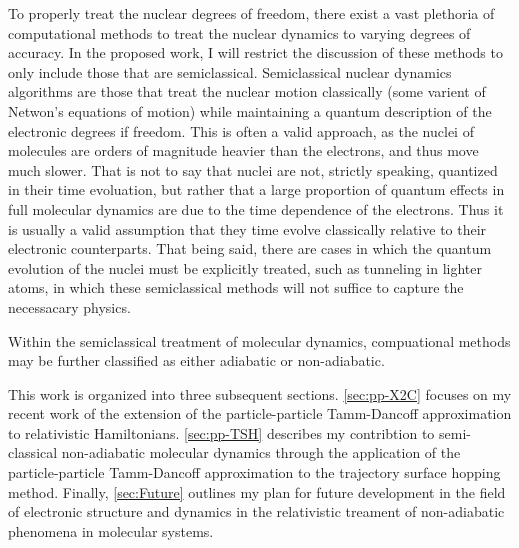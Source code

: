 \documentclass[12pt]{article}
\begin{document}
To properly treat the nuclear degrees of freedom, there exist a vast plethoria
of computational methods to treat the nuclear dynamics to varying degrees of
accuracy. In the proposed work, I will restrict the discussion of these methods
to only include those that are semiclassical. Semiclassical nuclear dynamics
algorithms are those that treat the nuclear motion classically (some varient of
Netwon's equations of motion) while maintaining a quantum description of the
electronic degrees if freedom. This is often a valid approach, as the nuclei of
molecules are orders of magnitude heavier than the electrons, and thus move much
slower. That is not to say that nuclei are not, strictly speaking, quantized in
their time evoluation, but rather that a large proportion of quantum effects in
full molecular dynamics are due to the time dependence of the electrons. Thus it
is usually a valid assumption that they time evolve classically relative to
their electronic counterparts. That being said, there are cases in which the
quantum evolution of the nuclei must be explicitly treated, such as tunneling in
lighter atoms, in which these semiclassical methods will not suffice to capture
the necessacary physics.

Within the semiclassical treatment of molecular dynamics, compuational methods
may be further classified as either adiabatic or non-adiabatic. 

This work is organized into three subsequent sections.
\cref{sec:pp-X2C} focuses on my recent work of the extension of the
particle-particle Tamm-Dancoff approximation to relativistic Hamiltonians.
\cref{sec:pp-TSH} describes my contribtion to semi-classical non-adiabatic
molecular dynamics through the application of the particle-particle Tamm-Dancoff
approximation to the trajectory surface hopping method.  Finally,
\cref{sec:Future} outlines my plan for future development in the field of
electronic structure and dynamics in the relativistic treament of non-adiabatic
phenomena in molecular systems.

\end{document}
